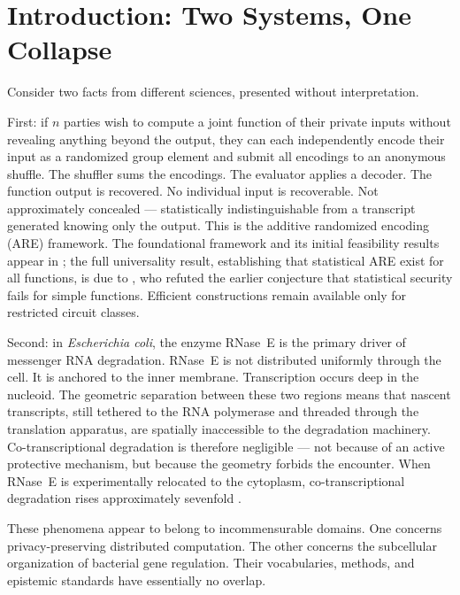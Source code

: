 \documentclass[12pt, a4paper]{article}
\theoremstyle{essaystyle}
\begin{document}
\section{Introduction: Two Systems, One Collapse}

Consider two facts from different sciences, presented without interpretation.

First: if $n$ parties wish to compute a joint function of their private inputs without
revealing anything beyond the output, they can each independently encode their input
as a randomized group element and submit all encodings to an anonymous shuffle.
The shuffler sums the encodings. The evaluator applies a decoder. The function output
is recovered. No individual input is recoverable. Not approximately concealed ---
statistically indistinguishable from a transcript generated knowing only the output.
This is the additive randomized encoding (ARE) framework. The foundational framework
and its initial feasibility results appear in \citet{halevi2023additive}; the full
universality result, establishing that statistical ARE exist for all functions, is due
to \citet{shufflinguniversal}, who refuted the earlier conjecture that statistical
security fails for simple functions. Efficient constructions remain available only for
restricted circuit classes.

Second: in \textit{Escherichia coli}, the enzyme RNase~E is the primary driver of
messenger RNA degradation. RNase~E is not distributed uniformly through the cell.
It is anchored to the inner membrane. Transcription occurs deep in the nucleoid.
The geometric separation between these two regions means that nascent transcripts,
still tethered to the RNA polymerase and threaded through the translation apparatus,
are spatially inaccessible to the degradation machinery. Co-transcriptional degradation
is therefore negligible --- not because of an active protective mechanism, but because
the geometry forbids the encounter. When RNase~E is experimentally relocated to the
cytoplasm, co-transcriptional degradation rises approximately sevenfold
\citep{kim2026spatial}.

These phenomena appear to belong to incommensurable domains. One concerns
privacy-preserving distributed computation. The other concerns the subcellular
organization of bacterial gene regulation. Their vocabularies, methods, and epistemic
standards have essentially no overlap.
\end{document}

